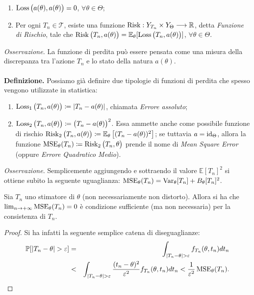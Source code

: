 \begin{enumerate}[noitemsep]
\item $\operatorname{Loss}\big(a(\theta),a(\theta)\big)=0$, $\forall \theta\in \Theta$;
\item Per ogni $T_n\in \mathcal{T}$, esiste una funzione $\operatorname{Risk}: Y_{T_n}\times Y_{\Theta}\longrightarrow \mathbb{R}$, detta \textit{Funzione di Rischio}, tale che $\operatorname{Risk}\big(T_n,a(\theta)\big)=\mathbb{E}_{\theta}[\operatorname{Loss}\big(T_n,a(\theta)\big)]$, $\forall \theta\in \Theta$. 
\end{enumerate}
\textit{Osservazione.} La funzione di perdita può essere pensata come una misura della discrepanza tra l'azione $T_n$ e lo stato della natura $a(\theta)$. \\ \\
\textbf{Definizione.} Possiamo già definire due tipologie di funzioni di perdita che spesso vengono utilizzate in statistica: 
\begin{enumerate}[noitemsep]
\item $\operatorname{Loss}_1\big(T_n,a(\theta)\big)\coloneqq |T_n-a(\theta)|$, chiamata \textit{Errore assoluto};
\item $\operatorname{Loss}_2\big(T_n,a(\theta)\big)\coloneqq \big(T_n-a(\theta)\big)^2$. Essa ammette anche come possibile funzione di rischio $\operatorname{Risk}_2\big(T_n,a(\theta)\big)\coloneqq \mathbb{E}_{\theta} \left[(T_n-a(\theta))^2\right]$; se tuttavia $a=\operatorname{id}_{\Theta}$, allora la funzione $\operatorname{MSE}_{\theta}(T_n)\coloneqq \operatorname{Risk}_2\big(T_n,\theta\big)$ prende il nome di \textit{Mean Square Error} (oppure \textit{Errore Quadratico Medio}).
\end{enumerate}
\textit{Osservazione.} Semplicemente aggiungendo e sottraendo il valore $\mathbb{E}[T_n]^2$ si ottiene subito la seguente uguaglianza: $\operatorname{MSE}_{\theta}(T_n)=\operatorname{Var}_\theta [T_n]+B_\theta [T_n]^2$.
\begin{teo}
Sia $T_n$ uno stimatore di $\theta$ (non necessariamente non distorto). Allora si ha che $\lim_{n\rightarrow +\infty} \operatorname{MSE}_\theta (T_n)=0$ è condizione sufficiente (ma non necessaria) per la consistenza di $T_n.$
\end{teo}
\begin{proof} Si ha infatti la seguente semplice catena di diseguaglianze: 
\begin{eqnarray*}
\mathbb{P}[|T_n-\theta|>\varepsilon] &=& \int_{|T_n-\theta|>\varepsilon} f_{T_n}(\theta,t_n)dt_n \\ 
&<& \int_{|T_n-\theta|>\varepsilon} \frac{(t_n-\theta)^2}{\varepsilon^2}f_{T_n}(\theta,t_n)dt_n < \frac{1}{\varepsilon^2}\mse_\theta (T_n).
\end{eqnarray*}
\end{proof}
